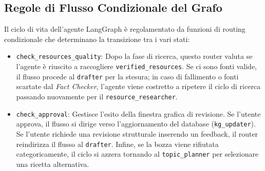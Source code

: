\documentclass[11pt, a4paper]{article}
\begin{document}
\subsection{Regole di Flusso Condizionale del Grafo}

Il ciclo di vita dell'agente LangGraph è regolamentato da funzioni di routing condizionale che determinano la transizione tra i vari stati:

\begin{itemize}
    \item \texttt{check\_resources\_quality}: Dopo la fase di ricerca, questo router valuta se l'agente è riuscito a raccogliere \texttt{verified\_resources}. Se ci sono fonti valide, il flusso procede al \texttt{drafter} per la stesura; in caso di fallimento o fonti scartate dal \textit{Fact Checker}, l'agente viene costretto a ripetere il ciclo di ricerca passando nuovamente per il \texttt{resource\_researcher}.
    \item \texttt{check\_approval}: Gestisce l'esito della finestra grafica di revisione. Se l'utente approva, il flusso si dirige verso l'aggiornamento del database (\texttt{kg\_updater}). Se l'utente richiede una revisione strutturale inserendo un feedback, il router reindirizza il flusso al \texttt{drafter}. Infine, se la bozza viene rifiutata categoricamente, il ciclo si azzera tornando al \texttt{topic\_planner} per selezionare una ricetta alternativa.
\end{itemize}
\end{document}
